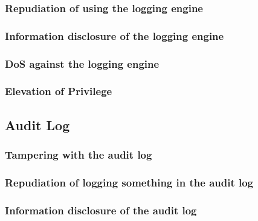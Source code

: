 \documentclass[a4paper,11pt]{report}
\begin{document}
\subsubsection{Repudiation of using the logging engine}
\subsubsection{Information disclosure of the logging engine}
\subsubsection{DoS against the logging engine}
\subsubsection{Elevation of Privilege}
\subsection{Audit Log}
\subsubsection{Tampering with the audit log}
\subsubsection{Repudiation of logging something in the audit log}
\subsubsection{Information disclosure of the audit log}
\end{document}
